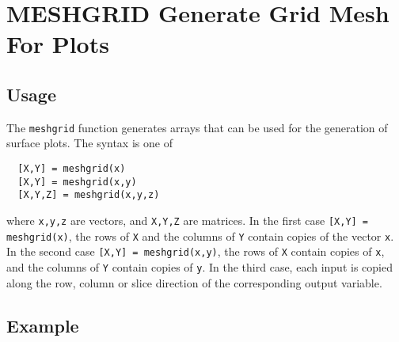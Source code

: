 \section{MESHGRID Generate Grid Mesh For Plots}

\subsection{Usage}

The \verb|meshgrid| function generates arrays that can be used for the
generation of surface plots.  The syntax is one of 
\begin{verbatim}
  [X,Y] = meshgrid(x)
  [X,Y] = meshgrid(x,y)
  [X,Y,Z] = meshgrid(x,y,z)
\end{verbatim}
where \verb|x,y,z| are vectors, and \verb|X,Y,Z| are matrices.  In the first
case \verb|[X,Y] = meshgrid(x)|, the rows of \verb|X| and the columns of \verb|Y|
contain copies of the vector \verb|x|.  In the second case 
\verb|[X,Y] = meshgrid(x,y)|, the rows of \verb|X| contain copies of \verb|x|, and
the columns of \verb|Y| contain copies of \verb|y|.  In the third case, each
input is copied along the row, column or slice direction of the
corresponding output variable.
\subsection{Example}

